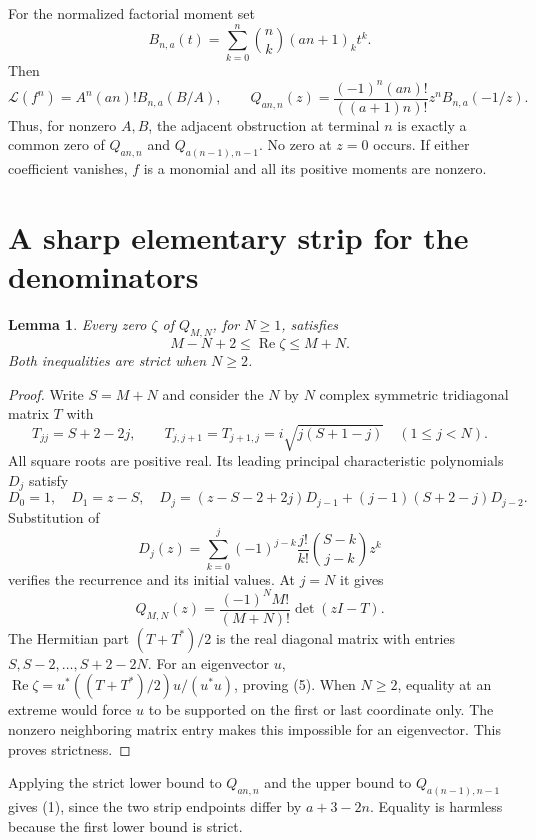 \documentclass[11pt]{article}
\newtheorem{lemma}[theorem]{Lemma}
\begin{document}
For the normalized factorial moment set
\[
 B_{n,a}(t)=\sum_{k=0}^n\binom nk(an+1)_k t^k.
\]
Then
\[
 \mathcal L(f^n)=A^n(an)!B_{n,a}(B/A),\qquad
 Q_{an,n}(z)=\frac{(-1)^n(an)!}{((a+1)n)!}
                  z^nB_{n,a}(-1/z).                 \tag{4}
\]
Thus, for nonzero $A,B$, the adjacent obstruction at terminal $n$ is
exactly a common zero of $Q_{an,n}$ and $Q_{a(n-1),n-1}$.
No zero at $z=0$ occurs. If either coefficient vanishes, $f$ is a monomial
and all its positive moments are nonzero.

\section{A sharp elementary strip for the denominators}
\begin{lemma}\label{lem:strip}
Every zero $\zeta$ of $Q_{M,N}$, for $N\ge1$, satisfies
\[
          M-N+2\le\operatorname{Re}\zeta\le M+N.       \tag{5}
\]
Both inequalities are strict when $N\ge2$.
\end{lemma}
\begin{proof}
Write $S=M+N$ and consider the $N$ by $N$ complex symmetric tridiagonal
matrix $T$ with
\[
 T_{jj}=S+2-2j,\qquad
 T_{j,j+1}=T_{j+1,j}=i\sqrt{j(S+1-j)}\quad(1\le j<N).
\]
All square roots are positive real. Its leading principal characteristic
polynomials $D_j$ satisfy
\[
 D_0=1,\quad D_1=z-S,\quad
 D_j=(z-S-2+2j)D_{j-1}+(j-1)(S+2-j)D_{j-2}.
\]
Substitution of
\[
 D_j(z)=\sum_{k=0}^j(-1)^{j-k}\frac{j!}{k!}
                      \binom{S-k}{j-k}z^k
\]
verifies the recurrence and its initial values. At $j=N$ it gives
\[
            Q_{M,N}(z)=\frac{(-1)^N M!}{(M+N)!}\det(zI-T).
\]
The Hermitian part $(T+T^*)/2$ is the real diagonal matrix with entries
$S,S-2,\ldots,S+2-2N$. For an eigenvector $u$,
$\operatorname{Re}\zeta=u^*((T+T^*)/2)u/(u^*u)$, proving (5).
When $N\ge2$, equality at an extreme would force $u$ to be supported
on the first or last coordinate only. The nonzero neighboring matrix
entry makes this impossible for an eigenvector. This proves strictness.
\end{proof}
Applying the strict lower bound to $Q_{an,n}$ and the upper bound to
$Q_{a(n-1),n-1}$ gives (1), since the two strip endpoints differ by
$a+3-2n$. Equality is harmless because the first lower bound is strict.
\end{document}
